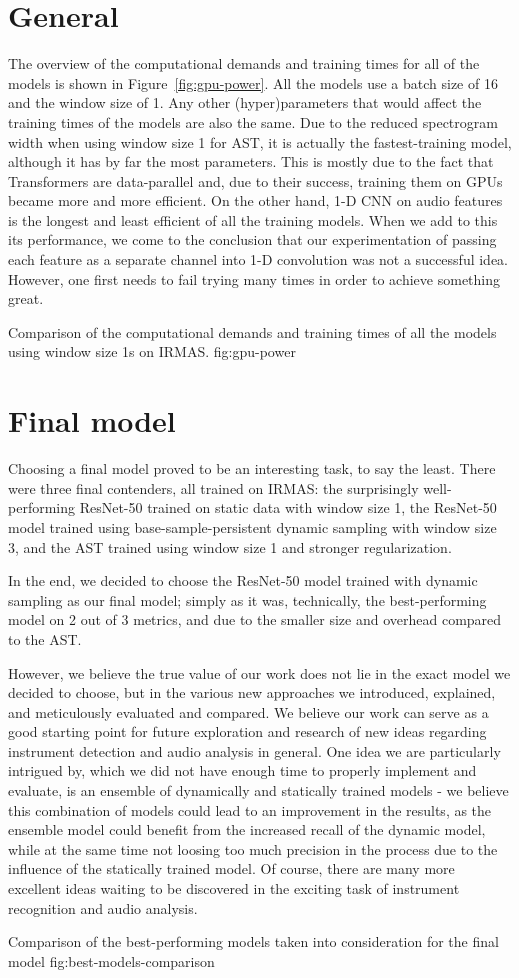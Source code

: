 \section{General}
\label{sec:eval:general}
The overview of the computational demands and training times for all of the models is shown in Figure~\ref{fig:gpu-power}. All the models use a batch size of 16 and the window size of 1. Any other (hyper)parameters that would affect the training times of the models are also the same. Due to the reduced spectrogram width when using window size 1 for AST, it is actually the fastest-training model, although it has by far the most parameters. This is mostly due to the fact that Transformers are data-parallel and, due to their success, training them on GPUs became more and more efficient. On the other hand, 1-D CNN on audio features is the longest and least efficient of all the training models. When we add to this its performance, we come to the conclusion that our experimentation of passing each feature as a separate channel into 1-D convolution was not a successful idea. However, one first needs to fail trying many times in order to achieve something great. 

	        {Comparison of the computational demands and training times of all the models using window size 1s on IRMAS.}
                {fig:gpu-power}


\section{Final model}

Choosing a final model proved to be an interesting task, to say the least. There were three final contenders, all trained on IRMAS: the surprisingly well-performing ResNet-50 trained on static data with window size 1, the ResNet-50 model trained using base-sample-persistent dynamic sampling with window size 3, and the AST trained using window size 1 and stronger regularization. 


In the end, we decided to choose the ResNet-50 model trained with dynamic sampling as our final model; simply as it was, technically, the best-performing model on 2 out of 3 metrics, and due to the smaller size and overhead compared to the AST. 

However, we believe the true value of our work does not lie in the exact model we decided to choose, but in the various new approaches we introduced, explained, and meticulously evaluated and compared. We believe our work can serve as a good starting point for future exploration and research of new ideas regarding instrument detection and audio analysis in general. One idea we are particularly intrigued by, which we did not have enough time to properly implement and evaluate, is an ensemble of dynamically and statically trained models - we believe this combination of models could lead to an improvement in the results, as the ensemble model could benefit from the increased recall of the dynamic model, while at the same time not loosing too much precision in the process due to the influence of the statically trained model. Of course, there are many more excellent ideas waiting to be discovered in the exciting task of instrument recognition and audio analysis.

	        {Comparison of the best-performing models taken into consideration for the final model}
                {fig:best-models-comparison}

